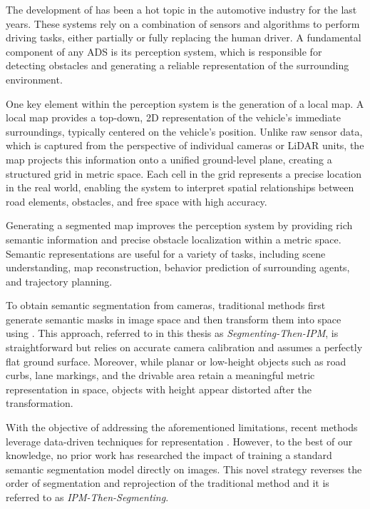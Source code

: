 The development of  has been a hot topic in the automotive industry for the last years. These systems rely on a combination of sensors and algorithms to perform driving tasks, either partially or fully replacing the human driver. A fundamental component of any ADS is its perception system,  which is responsible for detecting obstacles and generating a reliable representation of the surrounding environment.

One key element within the perception system is the generation of a local  map. A local  map provides a top-down, 2D representation of the vehicle's immediate surroundings, typically centered on the vehicle's position. Unlike raw sensor data, which is captured from the perspective of individual cameras or LiDAR units, the  map projects this information onto a unified ground-level plane, creating a structured grid in metric space. Each cell in the grid represents a precise location in the real world, enabling the system to interpret spatial relationships between road elements, obstacles, and free space with high accuracy.

Generating a segmented  map improves the perception system by providing rich semantic information and precise obstacle localization within a metric space. Semantic  representations are useful for a variety of tasks, including scene understanding, map reconstruction, behavior prediction of surrounding agents, and trajectory planning.

To obtain  semantic segmentation from cameras, traditional methods first generate semantic masks in image space and then transform them into  space using . This approach, referred to in this thesis as \textit{Segmenting-Then-IPM}, is straightforward but relies on accurate camera calibration and assumes a perfectly flat ground surface. Moreover, while planar or low-height objects such as road curbs, lane markings, and the drivable area retain a meaningful metric representation in  space, objects with height appear distorted after the transformation.

With the objective of addressing the aforementioned limitations, recent methods leverage data-driven techniques for  representation \cite{view_parsing_network} \cite{lift_splat_shoot} \cite{m2bev}. However, to the best of our knowledge, no prior work has researched the impact of training a standard semantic segmentation model directly on  images. This novel strategy reverses the order of segmentation and reprojection of the traditional method and it is referred to as \textit{IPM-Then-Segmenting}.

